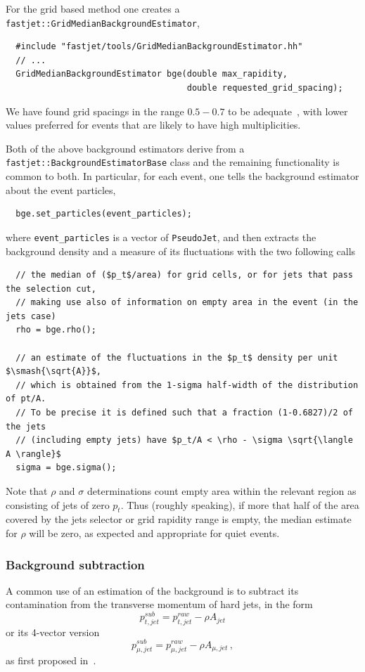 \documentclass[12pt,a4]{article}
\newcommand{\ttt}[1]{{\small\texttt{#1}}}
\newcommand{\PJ}{\ttt{PseudoJet}\xspace}
\begin{document}
For the grid based method one creates a
\ttt{fastjet::GridMedianBackgroundEstimator},
\begin{lstlisting}
  #include "fastjet/tools/GridMedianBackgroundEstimator.hh"
  // ...
  GridMedianBackgroundEstimator bge(double max_rapidity,
                                    double requested_grid_spacing);
\end{lstlisting}
We have found grid spacings in the range $0.5-0.7$ to be
adequate~\cite{GridMedianLH}, with lower values preferred for events
that are likely to have high multiplicities.

Both of the above background estimators derive from a
\ttt{fastjet::BackgroundEstimatorBase} class and the remaining
functionality is common to both.
%
In particular, for each event, one tells the background estimator
about the event particles,
\begin{lstlisting}
  bge.set_particles(event_particles);
\end{lstlisting}
where \ttt{event\_particles} is a vector of \PJ, and then extracts the
background density and a measure of its fluctuations with the two
following calls 
%
\begin{lstlisting}
  // the median of ($p_t$/area) for grid cells, or for jets that pass the selection cut, 
  // making use also of information on empty area in the event (in the jets case)
  rho = bge.rho(); 

  // an estimate of the fluctuations in the $p_t$ density per unit $\smash{\sqrt{A}}$,
  // which is obtained from the 1-sigma half-width of the distribution of pt/A.
  // To be precise it is defined such that a fraction (1-0.6827)/2 of the jets
  // (including empty jets) have $p_t/A < \rho - \sigma \sqrt{\langle A \rangle}$
  sigma = bge.sigma(); 
\end{lstlisting}
Note that $\rho$ and $\sigma$ determinations count empty area within
the relevant region as consisting of jets of zero $p_t$.
%
Thus (roughly speaking), if more that half of the area covered by the
jets selector or grid rapidity range is empty, the median estimate for
$\rho$ will be zero, as expected and appropriate for quiet events.


\subsubsection{Background subtraction}\label{sec:subtractor}

A common use of an estimation of the background is to subtract its contamination 
from the
transverse momentum of hard jets, in the form
\begin{equation}
p_{t,jet}^{sub} = p_{t,jet}^{raw} - \rho A_{jet} 
\end{equation}
or its 4-vector version
\begin{equation}
p_{\mu,jet}^{sub} = p_{\mu,jet}^{raw} - \rho A_{\mu,jet} \, ,
\end{equation}
as first proposed in~\cite{cs}.
\end{document}
